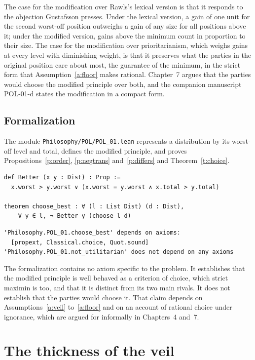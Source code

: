 \documentclass{situationist-preprint}
\begin{document}
The case for the modification over Rawls's lexical version is that it responds to the objection Gustafsson presses. Under the lexical version, a gain of one unit for the second worst-off position outweighs a gain of any size for all positions above it; under the modified version, gains above the minimum count in proportion to their size. The case for the modification over prioritarianism, which weighs gains at every level with diminishing weight, is that it preserves what the parties in the original position care about most, the guarantee of the minimum, in the strict form that Assumption~\ref{a:floor} makes rational. Chapter~7 argues that the parties would choose the modified principle over both, and the companion manuscript POL-01-d states the modification in a compact form.

\subsection*{Formalization}

The module \nolinkurl{Philosophy/POL/POL_01.lean} represents a distribution by its worst-off level and total, defines the modified principle, and proves Propositions~\ref{p:order}, \ref{p:negtrans} and~\ref{p:differs} and Theorem~\ref{t:choice}.

\begin{lstlisting}
def Better (x y : Dist) : Prop :=
  x.worst > y.worst ∨ (x.worst = y.worst ∧ x.total > y.total)

theorem choose_best : ∀ (l : List Dist) (d : Dist),
    ∀ y ∈ l, ¬ Better y (choose l d)
\end{lstlisting}

\begin{lstlisting}
'Philosophy.POL_01.choose_best' depends on axioms:
  [propext, Classical.choice, Quot.sound]
'Philosophy.POL_01.not_utilitarian' does not depend on any axioms
\end{lstlisting}

The formalization contains no axiom specific to the problem. It establishes that the modified principle is well behaved as a criterion of choice, which strict maximin is too, and that it is distinct from its two main rivals. It does not establish that the parties would choose it. That claim depends on Assumptions~\ref{a:veil} to~\ref{a:floor} and on an account of rational choice under ignorance, which are argued for informally in Chapters~4 and~7.

\section{The thickness of the veil}
\end{document}
